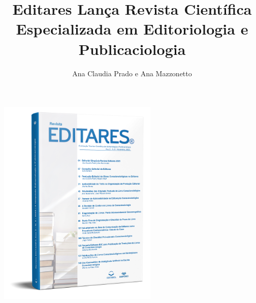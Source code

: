 \documentclass{gescons}
\author{Ana Claudia Prado e Ana Mazzonetto}
\title{Editares Lança Revista Científica Especializada em Editoriologia e Publicaciologia}
\begin{document}
    \makeentrevistatitle


    
    
\begin{center}
    \includegraphics[height=10cm]{articles/atualizacoes/fotos/materia6/revista_editares_2025.png} 
\end{center}
    
\end{document}

